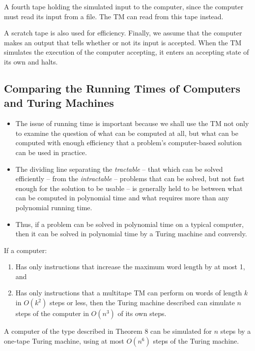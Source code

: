 \documentclass[]{article}
\begin{document}
A fourth tape holding the simulated input to the computer, since the computer
must read its input from a file. The TM can read from this tape instead.

A scratch tape is also used for efficiency.
Finally, we assume that the computer makes an output that tells whether or not
its input is accepted. When the TM simulates the execution of the computer
accepting, it enters an accepting state of its own and halts.

\subsection*{Comparing the Running Times of Computers and Turing Machines}
\begin{itemize}
\item The issue of running time is important because we shall use the TM not
only to examine the question of what can be computed at all, but what can be
computed with enough efficiency that a problem's computer-based solution can be
used in practice.
\item The dividing line separating the \emph{tractable} -- that which can be
solved efficiently -- from the \emph{intractable} -- problems that can be
solved, but not fast enough for the solution to be usable -- is generally held
to be between what can be computed in polynomial time and what requires more
than any polynomial running time.
\item Thus, if a problem can be solved in polynomial time on a typical computer,
then it can be solved in polynomial time by a Turing machine and conversly.
\end{itemize}

\begin{thm}
If a computer:
\begin{enumerate}
\item Has only instructions that increase the maximum word length by at most 1,
and
\item Has only instructions that a multitape TM can perform on words of length
$k$ in $O(k^2)$ steps or less, then the Turing machine described can simulate
$n$ steps of the computer in $O(n^3)$ of its own steps.
\end{enumerate}
\end{thm}

\begin{thm}
A computer of the type described in Theorem 8 can be simulated for $n$ steps by
a one-tape Turing machine, using at most $O(n^6)$ steps of the Turing machine.
\end{thm}
\end{document}
